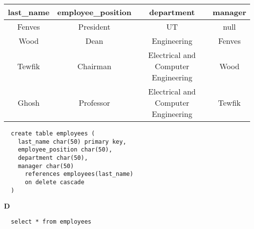 \documentclass[12pt, letterpaper, fleqn]{article}
\begin{document}
\begin{center}
\begin{tabular} { c | c | c | c }
  last\_name & employee\_position & department & manager\\
  \hline
  Fenves                                            &	President
  &	UT                                              & null  \\
Wood                                              &	Dean
&	Engineering                                       &	Fenves
\\
Tewfik                                            &	Chairman
&	Electrical and Computer Engineering               &	Wood
\\
Ghosh                                             &	Professor
&	Electrical and Computer Engineering               &	Tewfik
\\
\end{tabular}
\end{center}

\begin{verbatim}
  create table employees (
    last_name char(50) primary key,
    employee_position char(50),
    department char(50),
    manager char(50) 
      references employees(last_name)
      on delete cascade
  )
\end{verbatim}


  \textbf{D} \\
  \begin{verbatim}
  select * from employees
  \end{verbatim}
\end{document}
